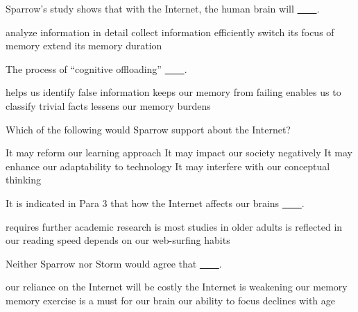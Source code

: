 \item Sparrow's study shows that with the Internet, the human brain will \uline{~~~~}.
\begin{tasks}
	\task analyze information in detail
	\task collect information efficiently
	\task switch its focus of memory
	\task extend its memory duration
\end{tasks}
\item The process of ``cognitive offloading'' \uline{~~~~}.
\begin{tasks}
	\task helps us identify false information
	\task keeps our memory from failing
	\task enables us to classify trivial facts
	\task lessens our memory burdens
\end{tasks}
\item Which of the following would Sparrow support about the Internet?
\begin{tasks}
	\task It may reform our learning approach
	\task It may impact our society negatively
	\task It may enhance our adaptability to technology
	\task It may interfere with our conceptual thinking
\end{tasks}
\item It is indicated in Para 3 that how the Internet affects our brains \uline{~~~~}.
\begin{tasks}
	\task requires further academic research
	\task is most studies in older adults
	\task is reflected in our reading speed
	\task depends on our web-surfing habits
\end{tasks}
\item Neither Sparrow nor Storm would agree that \uline{~~~~}.
\begin{tasks}
	\task our reliance on the Internet will be costly
	\task the Internet is weakening our memory
	\task memory exercise is a must for our brain
	\task our ability to focus declines with age
\end{tasks}